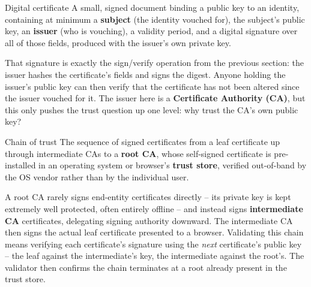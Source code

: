 \begin{definition}{Digital certificate}
A small, signed document binding a public key to an identity, containing at minimum a
\textbf{subject} (the identity vouched for), the subject's public key, an \textbf{issuer} (who is
vouching), a validity period, and a digital signature over all of those fields, produced with the
issuer's own private key.
\end{definition}

That signature is exactly the sign/verify operation from the previous section: the issuer hashes the
certificate's fields and signs the digest. Anyone holding the issuer's public key can then verify
that the certificate has not been altered since the issuer vouched for it. The issuer here is a
\textbf{Certificate Authority (CA)}, but this only pushes the trust question up one level: why trust
the CA's own public key?

\begin{definition}{Chain of trust}
The sequence of signed certificates from a leaf certificate up through intermediate CAs to a
\textbf{root CA}, whose self-signed certificate is pre-installed in an operating system or browser's
\textbf{trust store}, verified out-of-band by the OS vendor rather than by the individual user.
\end{definition}

A root CA rarely signs end-entity certificates directly -- its private key is kept extremely well
protected, often entirely offline -- and instead signs \textbf{intermediate CA} certificates,
delegating signing authority downward. The intermediate CA then signs the actual leaf certificate
presented to a browser. Validating this chain means verifying each certificate's signature using the
\emph{next} certificate's public key -- the leaf against the intermediate's key, the intermediate
against the root's. The validator then confirms the chain terminates at a root already present in
the trust store.

